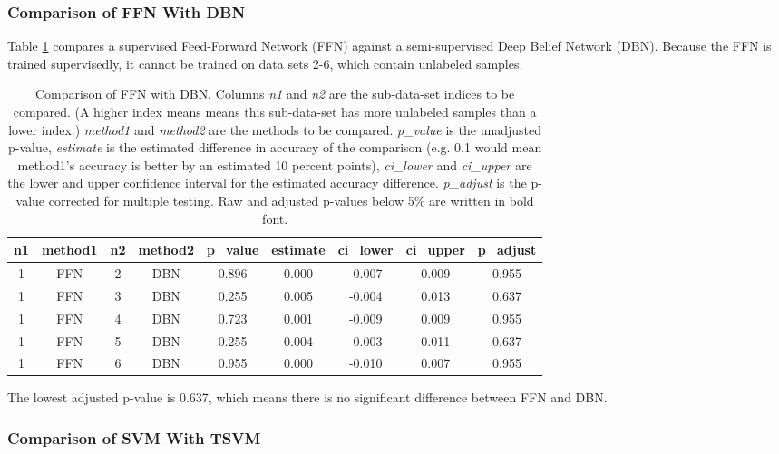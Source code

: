 \subsubsection{Comparison of FFN With DBN}

Table \ref{tab:breast_cancer_12-FFN-versus-DBN} compares a supervised
Feed-Forward Network (FFN) against a semi-supervised Deep Belief Network
(DBN). Because the FFN is trained supervisedly, it cannot be trained
on data sets 2-6, which contain unlabeled samples.

\begin{table}[p]
\begin{centering}
\begin{tabular}{|c|c|c|c|c|c|c|c|c|}
\hline 
n1 & method1 & n2 & method2 & p\_value & estimate & ci\_lower & ci\_upper & p\_adjust\tabularnewline
\hline 
\hline 
1 & FFN & 2 & DBN & 0.896 & 0.000 & -0.007 & 0.009 & 0.955\tabularnewline
\hline 
1 & FFN & 3 & DBN & 0.255 & 0.005 & -0.004 & 0.013 & 0.637\tabularnewline
\hline 
1 & FFN & 4 & DBN & 0.723 & 0.001 & -0.009 & 0.009 & 0.955\tabularnewline
\hline 
1 & FFN & 5 & DBN & 0.255 & 0.004 & -0.003 & 0.011 & 0.637\tabularnewline
\hline 
1 & FFN & 6 & DBN & 0.955 & 0.000 & -0.010 & 0.007 & 0.955\tabularnewline
\hline 
\end{tabular}
\par\end{centering}
\caption[Comparison of FFN with DBN.]{\label{tab:breast_cancer_12-FFN-versus-DBN}Comparison of FFN with
DBN. Columns \emph{n1} and \emph{n2} are the sub-data-set indices
to be compared. (A higher index means means this sub-data-set has
more unlabeled samples than a lower index.) \emph{method1} and \emph{method2}
are the methods to be compared. \emph{p\_value} is the unadjusted
p-value, \emph{estimate} is the estimated difference in accuracy of
the comparison (e.g. 0.1 would mean method1's accuracy is better by
an estimated 10 percent points), \emph{ci\_lower} and \emph{ci\_upper}
are the lower and upper confidence interval for the estimated accuracy
difference. \emph{p\_adjust} is the p-value corrected for multiple
testing. Raw and adjusted p-values below 5\% are written in bold font.}
\end{table}

The lowest adjusted p-value is 0.637, which means there is no significant
difference between FFN and DBN.

\subsubsection{Comparison of SVM With TSVM}

